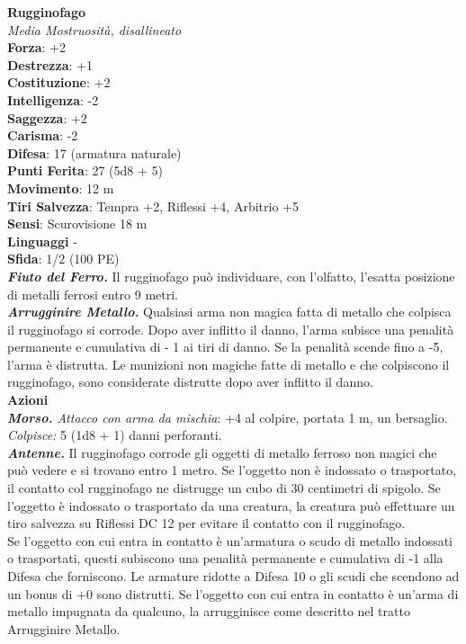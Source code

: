 \begin{multicols}{2}
\medskip\textbf{Rugginofago}\\
\emph{Media Mostruosità, disallineato}\\
\textbf{Forza}: +2\\
\textbf{Destrezza}: +1\\
\textbf{Costituzione}: +2\\
\textbf{Intelligenza}: -2\\
\textbf{Saggezza}: +2\\
\textbf{Carisma}: -2\\
\textbf{Difesa}: 17 (armatura naturale)\\
\textbf{Punti Ferita}: 27 (5d8 + 5)\\
\textbf{Movimento}: 12 m\\
\textbf{Tiri Salvezza}: Tempra +2, Riflessi +4, Arbitrio +5\\
\textbf{Sensi}: Scurovisione 18 m\\
\textbf{Linguaggi} -\\
\textbf{Sfida}: 1/2 (100 PE)\smallskip\\
\emph{\textbf{Fiuto del Ferro.}} Il rugginofago può individuare, con l'olfatto, l'esatta posizione di metalli ferrosi entro 9 metri.\\
\emph{\textbf{Arrugginire Metallo.}} Qualsiasi arma non magica fatta di metallo che colpisca il rugginofago si corrode. Dopo aver inflitto il danno, l'arma subisce una penalità permanente e cumulativa di - 1 ai tiri di danno. Se la penalità scende fino a -5, l'arma è distrutta. Le munizioni non magiche fatte di metallo e che colpiscono il rugginofago, sono considerate distrutte dopo aver inflitto il danno. \\
\smallskip\textbf{Azioni}\\
\emph{\textbf{Morso.} Attacco con arma da mischia}: +4 al colpire, portata 1 m, un bersaglio.
\emph{Colpisce:} 5 (1d8 + 1) danni perforanti.\\
\emph{\textbf{Antenne.}} Il rugginofago corrode gli oggetti di metallo ferroso non magici che può vedere e si trovano entro 1 metro. Se l'oggetto non è indossato o trasportato, il contatto col rugginofago ne distrugge un cubo di 30 centimetri di spigolo. Se l'oggetto è indossato o trasportato da una creatura, la creatura può effettuare un tiro salvezza su Riflessi DC  12 per evitare il contatto con il rugginofago. \\
Se l'oggetto con cui entra in contatto è un'armatura o scudo di metallo indossati o trasportati, questi subiscono una penalità permanente e cumulativa di -1 alla Difesa che forniscono. Le armature ridotte a Difesa 10 o gli scudi che scendono ad un bonus di +0 sono distrutti. Se l'oggetto con cui entra in contatto è un'arma di metallo impugnata da qualcuno, la arrugginisce come descritto nel tratto Arrugginire Metallo. 

\end{multicols}
